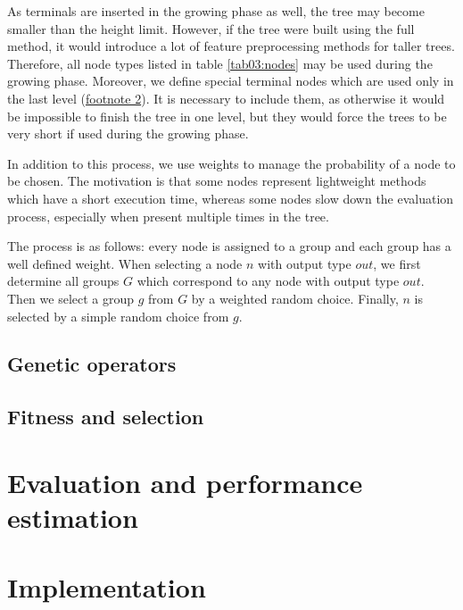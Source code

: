 As terminals are inserted in the growing phase as well, the tree may become
smaller than the height limit. However, if the tree were built using the full
method, it would introduce a lot of feature preprocessing methods for taller
trees. Therefore, all node types listed in table \ref{tab03:nodes} may be used
during the growing phase. Moreover, we define special terminal nodes which are
used only in the last level (\hyperref[tab03:nodes]{footnote 2}). It is
necessary to include them, as otherwise it would be impossible to finish the
tree in one level, but they would force the trees to be very short if used
during the growing phase.

In addition to this process, we use weights to manage the probability of a node
to be chosen. The motivation is that some nodes represent lightweight methods
which have a short execution time, whereas some nodes slow down the evaluation
process, especially when present multiple times in the tree.

The process is as follows: every node is assigned to a group and each group has
a well defined weight. When selecting a node $n$ with output type $out$, we 
first determine all groups $G$ which correspond to any node with output type
$out$. Then we select a group $g$ from $G$ by a weighted random choice.
Finally, $n$ is selected by a simple random choice from $g$.

\subsection{Genetic operators}

\subsection{Fitness and selection}

\section{Evaluation and performance estimation} \label{sec:eval}

\section{Implementation}